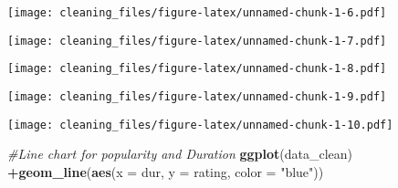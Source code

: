 \documentclass[
]{article}
\newenvironment{Shaded}{\begin{snugshade}}{\end{snugshade}}
\newcommand{\CommentTok}[1]{\textcolor[rgb]{0.56,0.35,0.01}{\textit{#1}}}
\newcommand{\DataTypeTok}[1]{\textcolor[rgb]{0.13,0.29,0.53}{#1}}
\newcommand{\DecValTok}[1]{\textcolor[rgb]{0.00,0.00,0.81}{#1}}
\newcommand{\KeywordTok}[1]{\textcolor[rgb]{0.13,0.29,0.53}{\textbf{#1}}}
\newcommand{\NormalTok}[1]{#1}
\newcommand{\OperatorTok}[1]{\textcolor[rgb]{0.81,0.36,0.00}{\textbf{#1}}}
\newcommand{\StringTok}[1]{\textcolor[rgb]{0.31,0.60,0.02}{#1}}
\begin{document}
\texttt{[image: cleaning\_files/figure-latex/unnamed-chunk-1-6.pdf]}

\begin{Shaded}
\end{Shaded}

\texttt{[image: cleaning\_files/figure-latex/unnamed-chunk-1-7.pdf]}

\begin{Shaded}
\end{Shaded}

\texttt{[image: cleaning\_files/figure-latex/unnamed-chunk-1-8.pdf]}

\begin{Shaded}
\end{Shaded}

\texttt{[image: cleaning\_files/figure-latex/unnamed-chunk-1-9.pdf]}

\begin{Shaded}
\end{Shaded}

\texttt{[image: cleaning\_files/figure-latex/unnamed-chunk-1-10.pdf]}

\begin{Shaded}
\begin{Highlighting}[]
\CommentTok{#Line chart for popularity and Duration}
\KeywordTok{ggplot}\NormalTok{(data_clean) }\OperatorTok{+}\KeywordTok{geom_line}\NormalTok{(}\KeywordTok{aes}\NormalTok{(}\DataTypeTok{x =}\NormalTok{ dur, }\DataTypeTok{y =}\NormalTok{ rating, }\DataTypeTok{color =} \StringTok{"blue"}\NormalTok{))}
\end{Highlighting}
\end{Shaded}
\end{document}
